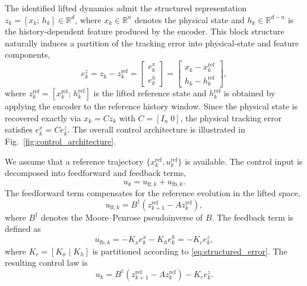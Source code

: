 \documentclass[journal]{IEEEtran}
\begin{document}
The identified lifted dynamics admit the structured representation $z_k = [x_k;\, h_k] \in \mathbb{R}^d$, where $x_k \in \mathbb{R}^n$ denotes the physical state and $h_k \in \mathbb{R}^{d-n}$ is the history-dependent feature produced by the encoder. This block structure naturally induces a partition of the tracking error into physical-state and feature components,
\begin{equation}
    e_k^z = z_k - z_k^{\mathrm{ref}} 
    = \begin{bmatrix} e_k^x \\ e_k^h \end{bmatrix}
    = \begin{bmatrix} x_k - x_k^{\mathrm{ref}} \\ h_k - h_k^{\mathrm{ref}} \end{bmatrix},
    \label{eq:structured_error}
\end{equation}
where $z_k^{\mathrm{ref}} = [x_k^{\mathrm{ref}};\, h_k^{\mathrm{ref}}]$ is the lifted reference state and $h_k^{\mathrm{ref}}$ is obtained by applying the encoder to the reference history window. Since the physical state is recovered exactly via $x_k = C z_k$ with $C = [I_n\;0]$, the physical tracking error satisfies $e_k^x = C e_k^z$. The overall control architecture is illustrated in Fig.~\ref{fig:control_architecture}.

We assume that a reference trajectory $\{x_k^{\mathrm{ref}}, u_k^{\mathrm{ref}}\}$ is available. The control input is decomposed into feedforward and feedback terms,
\begin{equation}
    u_k = u_{\mathrm{ff},k} + u_{\mathrm{fb},k}.
    \label{eq:ctrl_decomp}
\end{equation}
The feedforward term compensates for the reference evolution in the lifted space,
\begin{equation}
    u_{\mathrm{ff},k} = B^\dagger\!\left(z_{k+1}^{\mathrm{ref}} - A z_k^{\mathrm{ref}}\right),
    \label{eq:feedforward}
\end{equation}
where $B^\dagger$ denotes the Moore--Penrose pseudoinverse of $B$. The feedback term is defined as
\begin{equation}
    u_{\mathrm{fb},k} = -K_x e_k^x - K_h e_k^h = -K_c e_k^z,
    \label{eq:hierarchical_fb}
\end{equation}
where $K_c = [K_x\;|\;K_h]$ is partitioned according to \eqref{eq:structured_error}. The resulting control law is
\begin{equation}
    u_k = B^\dagger\!\left(z_{k+1}^{\mathrm{ref}} - A z_k^{\mathrm{ref}}\right) - K_c e_k^z.
    \label{eq:full_ctrl}
\end{equation}
\end{document}
